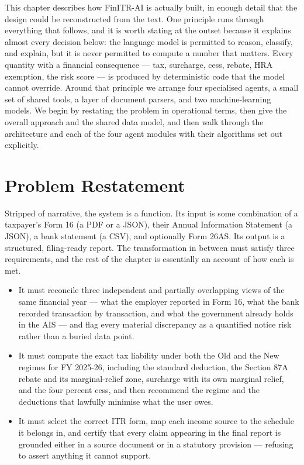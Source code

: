 \documentclass[12pt, a4paper, oneside]{report}
\begin{document}
This chapter describes how FinITR-AI is actually built, in enough detail that
the design could be reconstructed from the text. One principle runs through
everything that follows, and it is worth stating at the outset because it
explains almost every decision below: the language model is permitted to reason,
classify, and explain, but it is never permitted to compute a number that
matters. Every quantity with a financial consequence --- tax, surcharge, cess,
rebate, HRA exemption, the risk score --- is produced by deterministic code that
the model cannot override. Around that principle we arrange four specialised
agents, a small set of shared tools, a layer of document parsers, and two
machine-learning models. We begin by restating the problem in operational terms,
then give the overall approach and the shared data model, and then walk through
the architecture and each of the four agent modules with their algorithms set
out explicitly.

\section{Problem Restatement}
\label{sec:problem-restatement}

Stripped of narrative, the system is a function. Its input is some combination
of a taxpayer's Form 16 (a PDF or a JSON), their Annual Information Statement (a
JSON), a bank statement (a CSV), and optionally Form 26AS. Its output is a
structured, filing-ready report. The transformation in between must satisfy
three requirements, and the rest of the chapter is essentially an account of how
each is met.

\begin{itemize}
    \item It must reconcile three independent and partially overlapping views of
          the same financial year --- what the employer reported in Form 16,
          what the bank recorded transaction by transaction, and what the
          government already holds in the AIS --- and flag every material
          discrepancy as a quantified notice risk rather than a buried data
          point.
    \item It must compute the exact tax liability under both the Old and the New
          regimes for FY 2025-26, including the standard deduction, the Section
          87A rebate and its marginal-relief zone, surcharge with its own
          marginal relief, and the four percent cess, and then recommend the
          regime and the deductions that lawfully minimise what the user owes.
    \item It must select the correct ITR form, map each income source to the
          schedule it belongs in, and certify that every claim appearing in the
          final report is grounded either in a source document or in a statutory
          provision --- refusing to assert anything it cannot support.
\end{itemize}
\end{document}
